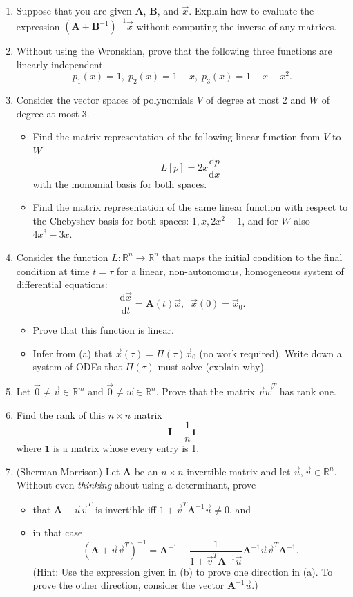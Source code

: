 \documentclass[11pt,fleqn]{article}
\newcommand{\mat}[1]{\mathbf{#1}}
\begin{document}
\begin{enumerate}
\item Suppose that you are given $\mat{A}$, $\mat{B}$, and $\vec{x}$. Explain how to evaluate the expression $(\mathbf{A}+\mathbf{B}^{-1})^{-1}\vec{x}$ without computing the inverse of any matrices.
\item Without using the Wronskian, prove that the following three functions are linearly independent
\[p_1(x) = 1,\;p_2(x) = 1 - x,\;p_3(x) = 1 - x + x^2.\]
\item Consider the vector spaces of polynomials $V$ of degree at most 2 and $W$ of degree at most 3. 
	\begin{itemize}
	\item[(a)] Find the matrix representation of the following linear function from $V$ to $W$
	\[L[p] = 2x\frac{\mathrm{d}p}{\mathrm{d}x}\]
	with the monomial basis for both spaces.
	\item[(b)] Find the matrix representation of the same linear function with respect to the Chebyshev basis for both spaces: $1, x, 2x^2 - 1$, and for $W$ also $4x^3-3x$.
	\end{itemize}
\item Consider the function $L:\mathbb{R}^n\to\mathbb{R}^n$ that maps the initial condition to the final condition at time $t=\tau$ for a linear, non-autonomous, homogeneous system of differential equations:
\[\frac{\mathrm{d}\vec{x}}{\mathrm{d}t} = \mathbf{A}(t)\vec{x},\;\;\vec{x}(0) = \vec{x}_0.\]
	\begin{itemize}
	\item[(a)] Prove that this function is linear.
	\item[(b)] Infer from (a) that $\vec{x}(\tau) = \Pi(\tau)\vec{x}_0$ (no work required). Write down a system of ODEs that $\Pi(\tau)$ must solve (explain why).
	\end{itemize}
\item Let $\vec{0}\neq \vec{v}\in\mathbb{R}^m$ and $\vec{0}\neq\vec{w}\in\mathbb{R}^n$. Prove that the matrix $\vec{v}\vec{w}^T$ has rank one.
\item Find the rank of this $n\times n$ matrix
\[\mathbf{I} - \frac{1}{n}\mathbf{1}\]
where $\mathbf{1}$ is a matrix whose every entry is 1.
\item (Sherman-Morrison) Let $\mathbf{A}$ be an $n\times n$ invertible matrix and let $\vec{u},\vec{v}\in\mathbb{R}^n$. Without even {\it thinking} about using a determinant, prove
	\begin{itemize}
	\item[(a)] that $\mathbf{A}+\vec{u}\vec{v}^T$ is invertible iff $1+\vec{v}^T\mathbf{A}^{-1}\vec{u}\neq0$, and
	\item[(b)] in that case
	\[\left(\mathbf{A}+\vec{u}\vec{v}^T\right)^{-1} = \mat{A}^{-1} - \frac{1}{1+\vec{v}^T\mathbf{A}^{-1}\vec{u}}\mat{A}^{-1}\vec{u}\vec{v}^T\mat{A}^{-1}.\]
	(Hint: Use the expression given in (b) to prove one direction in (a). To prove the other direction, consider the vector $\mathbf{A}^{-1}\vec{u}$.)
	\end{itemize}
\end{enumerate}
 
\end{document}
